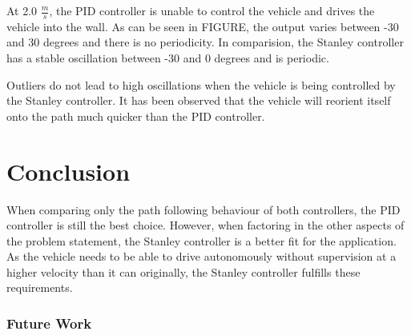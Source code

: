 \documentclass[arbeit=studie,oneside,BCOR=12mm]{ArbeitRST}
\begin{document}
At 2.0 $\frac{m}{s}$, the PID controller is unable to control the vehicle and
drives the vehicle into the wall. As can be seen in FIGURE, the output varies
between -30 and 30 degrees and there is no periodicity. In comparision, the
Stanley controller has a stable oscillation between -30 and 0 degrees and is
periodic.

Outliers do not lead to high oscillations when the vehicle is being controlled
by the Stanley controller. It has been observed that the vehicle will reorient
itself onto the path much quicker than the PID controller.



\chapter{Conclusion}

When comparing only the path following behaviour of both controllers, the PID controller
is still the best choice. However, when factoring in the other aspects of the problem statement,
the Stanley controller is a better fit for the application. As the vehicle needs to be able to
drive autonomously without supervision at a higher velocity than it can originally, the Stanley 
controller fulfills these requirements. 

\subsection{Future Work}
\end{document}
